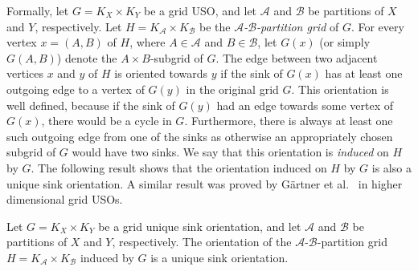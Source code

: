\documentclass[runningheads,a4paper]{llncs}
\newcommand{\A}{\ensuremath{\mathcal A}}
\newcommand{\B}{\ensuremath{\mathcal B}}
\begin{document}
Formally, let $G = K_X \times K_Y$ be a grid USO,
and let $\A$ and $\B$ be partitions of $X$ and $Y$, respectively.
Let $H = K_\A \times K_\B$ be the \emph{$\A$-$\B$-partition grid} of $G$.
For every vertex $x = (A,B)$ of $H$, where $A\in \A$ and $B \in \B$, let $G(x)$ (or simply $G(A,B)$)
denote the $A \times B$-subgrid of $G$. 
The edge between two adjacent vertices $x$ and $y$ of $H$ is oriented towards $y$ if the sink of $G(x)$ has at least one outgoing edge to a vertex of $G(y)$ in the original grid $G$. 
This orientation is well defined, because if the sink of $G(y)$ had an edge towards some vertex of $G(x)$, there would be a cycle in $G$. 
Furthermore, there is always at least one such outgoing edge from one of the sinks as otherwise an appropriately chosen subgrid of $G$ would have two sinks. 
We say that this orientation is \emph{induced} on $H$ by $G$.
The following result shows that the orientation induced on $H$ by $G$ is also a unique sink orientation. 
A similar result was proved by G\"artner et al.~\cite{grid08} in higher dimensional grid USOs. 

\begin{lemma}\label{lemma:USO-Lemma}
Let $G = K_X \times K_Y$ be a grid unique sink orientation,
and let $\A$ and $\B$ be partitions of $X$ and $Y$, respectively.
The orientation of the $\A$-$\B$-partition grid $H = K_\A \times K_\B$ induced by $G$ is a unique sink orientation.
\end{lemma}
\end{document}
